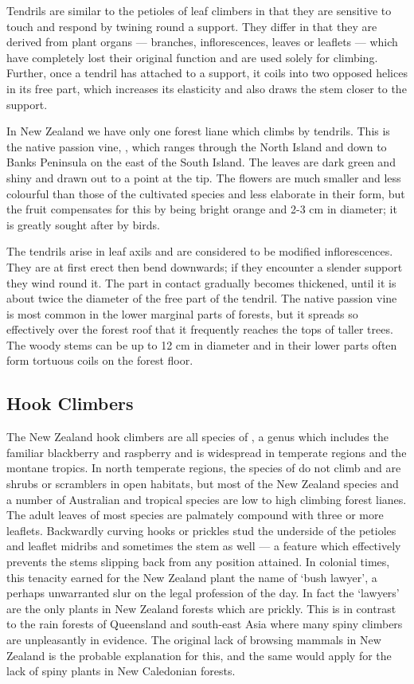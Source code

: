 Tendrils are similar to the petioles of leaf climbers in that they are sensitive to touch and respond by twining round a support.
They differ in that they are derived from plant organs — branches, inflorescences, leaves or leaflets — which have completely lost their original function and are used solely for climbing.
Further, once a tendril has attached to a support, it coils into two opposed helices in its free part, which increases its elasticity and also draws the stem closer to the support.

In New Zealand we have only one forest liane which climbs by tendrils.
This is the native passion vine, , which ranges through the North Island and down to Banks Peninsula on the east of the South Island.
The leaves are dark green and shiny and drawn out to a point at the tip.
The flowers are much smaller and less colourful than those of the cultivated species and less elaborate in their form, but the fruit compensates for this by being bright orange and 2-3 cm in diameter; it is greatly sought after by birds.

The tendrils arise in leaf axils and are considered to be modified inflorescences.
They are at first erect then bend downwards; if they encounter a slender support they wind round it.
The part in contact gradually becomes thickened, until it is about twice the diameter of the free part of the tendril.
The native passion vine is most common in the lower marginal parts of forests, but it spreads so effectively over the forest roof that it frequently reaches the tops of taller trees.
The woody stems can be up to 12 cm in diameter and in their lower parts often form tortuous coils on the forest floor.

\subsection{Hook Climbers}

The New Zealand hook climbers are all species of , a genus which includes the familiar blackberry and raspberry and is widespread in temperate regions and the montane tropics.
In north temperate regions, the species of  do not climb and are shrubs or scramblers in open habitats, but most of the New Zealand species and a number of Australian and tropical species are low to high climbing forest lianes.
The adult leaves of most species are palmately compound with three or more leaflets.
Backwardly curving hooks or prickles stud the underside of the petioles and leaflet midribs and sometimes the stem as well — a feature which effectively prevents the stems slipping back from any position attained.
In colonial times, this tenacity earned for the New Zealand plant the name of `bush lawyer', a perhaps unwarranted slur on the legal profession of the day.
In fact the `lawyers' are the only plants in New Zealand forests which are prickly.
This is in contrast to the rain forests of Queensland and south-east Asia where many spiny climbers are unpleasantly in evidence.
The original lack of browsing mammals in New Zealand is the probable explanation for this, and the same would apply for the lack of spiny plants in New Caledonian forests.

